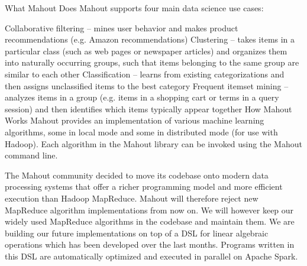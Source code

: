 \begin{itemize}
What Mahout Does
Mahout supports four main data science use cases:

Collaborative filtering – mines user behavior and makes product recommendations (e.g. Amazon recommendations)
Clustering – takes items in a particular class (such as web pages or newspaper articles) and organizes them into naturally occurring groups, such that items belonging to the same group are similar to each other
Classification – learns from existing categorizations and then assigns unclassified items to the best category
Frequent itemset mining – analyzes items in a group (e.g. items in a shopping cart or terms in a query session) and then identifies which items typically appear together
How Mahout Works
Mahout provides an implementation of various machine learning algorithms, some in local mode and some in distributed mode (for use with Hadoop). Each algorithm in the Mahout library can be invoked using the Mahout command line.

The Mahout community decided to move its codebase onto modern data processing systems that offer a richer programming model and more efficient execution than Hadoop MapReduce. Mahout will therefore reject new MapReduce algorithm implementations from now on. We will however keep our widely used MapReduce algorithms in the codebase and maintain them.
We are building our future implementations on top of a DSL for linear algebraic operations which has been developed over the last months. Programs written in this DSL are automatically optimized and executed in parallel on Apache Spark.

\end{itemize}

